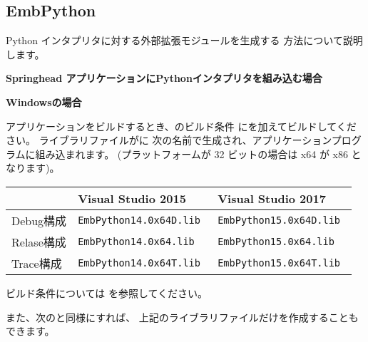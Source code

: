 \newpage
\subsection{EmbPython}
\label{subsec:EmbPython}
\parindent=0pt

Python インタプリタに対する外部拡張モジュールを生成する 方法について説明します。

\medskip
\thinrule{\linewidth}
\noindent
\bf{Springhead アプリケーションにPythonインタプリタを組み込む場合}

\bigskip
\bf{Windowsの場合}
\begin{narrow}
	アプリケーションをビルドするとき、\QCMakeSettings{}のビルド条件
	にを加えてビルドしてください。
	ライブラリファイルがに
	次の名前で生成され、アプリケーションプログラムに組み込まれます。
 	(プラットフォームが 32 ビットの場合は x64 が x86 となります)。
	
	\medskip
	\begin{narrow}[10pt]
	\begin{tabular}{l@{\ \ ---\ \ }ll}\hline
	    & Visual Studio 2015 & Visual Studio 2017 \\\hline
	    Debug構成 & \tt{EmbPython14.0x64D.lib} & \tt{EmbPython15.0x64D.lib} \\
	    Relase構成 & \tt{EmbPython14.0x64.lib} & \tt{EmbPython15.0x64.lib} \\
	    Trace構成 & \tt{EmbPython14.0x64T.lib} & \tt{EmbPython15.0x64T.lib} \\\hline
	\end{tabular}
	\end{narrow}

	\bigskip
	ビルド条件については
	を参照してください。

	また、次のと同様にすれば、
	上記のライブラリファイルだけを作成することもできます。
\end{narrow}

